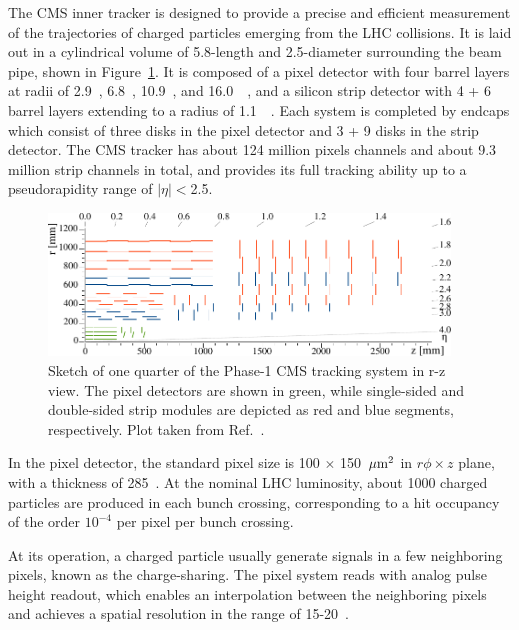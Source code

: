 The CMS inner tracker is designed to provide a precise and efficient measurement of the trajectories of charged particles emerging from the LHC collisions.
It is laid out in a cylindrical volume of 5.8-\meter length and 2.5-\meter diameter surrounding the beam pipe, shown in Figure~\ref{fig:cms_tracker}.
It is composed of a pixel detector with four barrel layers at radii of 2.9~\cm, 6.8~\cm, 10.9~\cm, and 16.0~\cm~\cite{phase1_tracker},
and a silicon strip detector with 4 + 6 barrel layers extending to a radius of 1.1~\meter~\cite{Collaboration_2008}.
Each system is completed by endcaps which consist of three disks in the pixel detector and 3 + 9 disks in the strip detector.
The CMS tracker has about 124 million pixels channels and about 9.3 million strip channels in total,
and provides its full tracking ability up to a pseudorapidity range of $|\eta| < $2.5.

\begin{figure}[!htb]
    \centering
    \captionsetup{justification=justified}
    \includegraphics[width=0.95\textwidth]{pics/LHC_CMS/Phase1_Tracker.pdf}
    \caption{Sketch of one quarter of the Phase-1 CMS tracking system in r-z view.
             The pixel detectors are shown in green, 
             while single-sided and double-sided strip modules are depicted as red and blue segments, respectively.
             Plot taken from Ref.~\cite{phase1_tracker}.}
    \label{fig:cms_tracker}
\end{figure}

In the pixel detector, the standard pixel size is 100 $\times$ 150 $\,\mu\text{m}^{2}$ in $r\phi \times z$ plane, with a thickness of 285~\mum.
At the nominal LHC luminosity, about 1000 charged particles are produced in each bunch crossing, 
corresponding to a hit occupancy of the order $10^{-4}$ per pixel per bunch crossing.

At its operation, a charged particle usually generate signals in a few neighboring pixels, known as the charge-sharing.
The pixel system reads with analog pulse height readout, which enables an interpolation between the neighboring pixels
and achieves a spatial resolution in the range of 15-20~\mum.

